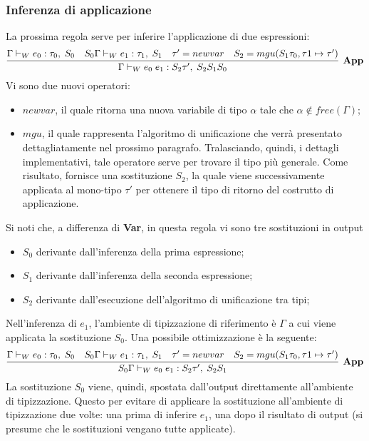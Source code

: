 \documentclass[10pt,a4paper]{article}
\begin{document}
\subsubsection{Inferenza di applicazione}
La prossima regola serve per inferire l'applicazione di due espressioni:
\[ \infer[\textbf{App}]{\Gamma \vdash_W e_0 \; e_1 : S_2\tau', \; S_2S_1S_0}{\Gamma \vdash_W e_0 : \tau_0, \; S_0 & S_0\Gamma \vdash_W e_1 : \tau_1, \; S_1 & \tau' = newvar & S_2 = mgu(S_1\tau_0, \tau1 \mapsto \tau')} \]
Vi sono due nuovi operatori:
\begin{itemize}
    \item $ newvar $, il quale ritorna una nuova variabile di tipo $ \alpha $ tale che $ \alpha \notin free(\Gamma) $;
    \item $ mgu $, il quale rappresenta l'algoritmo di unificazione che verrà presentato dettagliatamente nel prossimo
    paragrafo. Tralasciando, quindi, i dettagli implementativi, tale operatore serve per trovare il tipo più generale.
    Come risultato, fornisce una sostituzione $ S_2 $, la quale viene successivamente applicata al mono-tipo $ \tau' $
    per ottenere il tipo di ritorno del costrutto di applicazione.
\end{itemize}
Si noti che, a differenza di \textbf{Var}, in questa regola vi sono tre sostituzioni in output
\begin{itemize}
    \item $ S_0 $ derivante dall'inferenza della prima espressione;
    \item $ S_1 $ derivante dall'inferenza della seconda espressione;
    \item $ S_2 $ derivante dall'esecuzione dell'algoritmo di unificazione tra tipi;
\end{itemize}
Nell'inferenza di $ e_1 $, l'ambiente di tipizzazione di riferimento è $ \Gamma $ a cui viene applicata la sostituzione
$ S_0 $. Una possibile ottimizzazione è la seguente:
\[ \infer[\textbf{App}]{S_0\Gamma \vdash_W e_0 \; e_1 : S_2\tau', \; S_2S_1}{\Gamma \vdash_W e_0 : \tau_0, \; S_0 & S_0\Gamma \vdash_W e_1 : \tau_1, \; S_1 & \tau' = newvar & S_2 = mgu(S_1\tau_0, \tau1 \mapsto \tau')} \]
La sostituzione $ S_0 $ viene, quindi, spostata dall'output direttamente all'ambiente di tipizzazione. Questo per evitare
di applicare la sostituzione all'ambiente di tipizzazione due volte: una prima di inferire $ e_1 $, una dopo il risultato
di output (si presume che le sostituzioni vengano tutte applicate).
\end{document}
